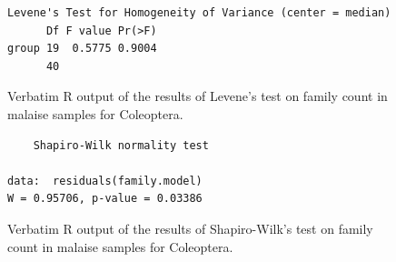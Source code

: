 \documentclass[10pt,letterpaper,twocolumn]{article}
\begin{document}
\begin{figure}[h]
	\lstset{numbers=left}
	\lstset{xleftmargin=5mm,framexleftmargin=5mm}
	\begin{lstlisting}
Levene's Test for Homogeneity of Variance (center = median)
      Df F value Pr(>F)
group 19  0.5775 0.9004
      40               
	\end{lstlisting}
	\caption{Verbatim R output of the results of Levene's test on family count in malaise samples for Coleoptera.}
	\label{fig:malaise_coleoptera_family_levene}
	\smallskip
	\nointerlineskip
	\hrulefill
\end{figure}

\begin{figure}[h]
	\lstset{numbers=left}
	\lstset{xleftmargin=5mm,framexleftmargin=5mm}
	\begin{lstlisting}
	Shapiro-Wilk normality test

data:  residuals(family.model)
W = 0.95706, p-value = 0.03386
	\end{lstlisting}
	\caption{Verbatim R output of the results of Shapiro-Wilk's test on family count in malaise samples for Coleoptera.}
	\label{fig:malaise_coleoptera_family_shapiro}
	\smallskip
	\nointerlineskip
	\hrulefill
\end{figure}
\end{document}
